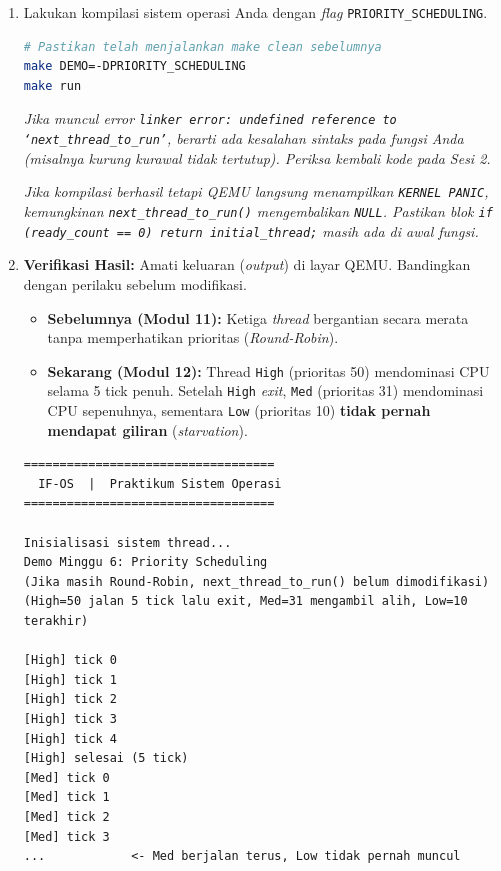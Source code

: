 \begin{enumerate}
	\item Lakukan kompilasi sistem operasi Anda dengan \textit{flag} \texttt{PRIORITY\_SCHEDULING}.
	      \begin{lstlisting}[language=bash, caption={Kompilasi dan jalankan dengan Priority Scheduling}]
# Pastikan telah menjalankan make clean sebelumnya
make DEMO=-DPRIORITY_SCHEDULING
make run
    \end{lstlisting}

	      \textit{Jika muncul error \texttt{linker error: undefined reference to `next\_thread\_to\_run'}, berarti ada kesalahan sintaks pada fungsi Anda (misalnya kurung kurawal tidak tertutup). Periksa kembali kode pada Sesi 2.}

	      \textit{Jika kompilasi berhasil tetapi QEMU langsung menampilkan \texttt{KERNEL PANIC}, kemungkinan \texttt{next\_thread\_to\_run()} mengembalikan \texttt{NULL}. Pastikan blok \texttt{if (ready\_count == 0) return initial\_thread;} masih ada di awal fungsi.}

	\item \textbf{Verifikasi Hasil:} Amati keluaran (\textit{output}) di layar QEMU. Bandingkan dengan perilaku sebelum modifikasi.
	      \begin{itemize}
		      \item \textbf{Sebelumnya (Modul 11):} Ketiga \textit{thread} bergantian secara merata tanpa memperhatikan prioritas (\textit{Round-Robin}).
		      \item \textbf{Sekarang (Modul 12):} Thread \texttt{High} (prioritas 50) mendominasi CPU selama 5 tick penuh. Setelah \texttt{High} \textit{exit}, \texttt{Med} (prioritas 31) mendominasi CPU sepenuhnya, sementara \texttt{Low} (prioritas 10) \textbf{tidak pernah mendapat giliran} (\textit{starvation}).
	      \end{itemize}

	      \begin{lstlisting}[caption={Ekspektasi keluaran QEMU setelah Priority Scheduling}]
===================================
  IF-OS  |  Praktikum Sistem Operasi
===================================

Inisialisasi sistem thread...
Demo Minggu 6: Priority Scheduling
(Jika masih Round-Robin, next_thread_to_run() belum dimodifikasi)
(High=50 jalan 5 tick lalu exit, Med=31 mengambil alih, Low=10 terakhir)

[High] tick 0
[High] tick 1
[High] tick 2
[High] tick 3
[High] tick 4
[High] selesai (5 tick)
[Med] tick 0
[Med] tick 1
[Med] tick 2
[Med] tick 3
...            <- Med berjalan terus, Low tidak pernah muncul
    \end{lstlisting}


\end{enumerate}
